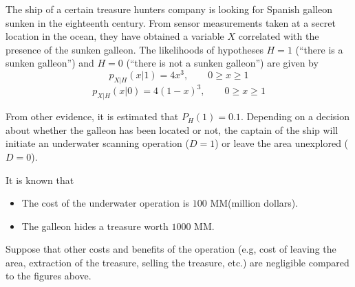 \begin{solution}
\end{solution}

\else
\question[25] %

The ship of a certain treasure hunters company is looking for Spanish galleon sunken in the eighteenth century. From sensor measurements taken at a secret location in the ocean, they have obtained a variable $X$ correlated with the presence of the sunken galleon. The likelihoods of hypotheses $H=1$ (``there is a sunken galleon'') and $H=0$ (``there is not a sunken galleon'') are given by
$$p_{X|H}(x|1) = 4 x^3,     \qquad 0 \ge x \ge 1$$
$$p_{X|H}(x|0) = 4 (1-x)^3, \qquad 0 \ge x \ge 1$$

From other evidence, it is estimated that $P_H(1) = 0.1$. Depending on a decision about whether the galleon has been located or not, the captain of the ship will initiate an underwater scanning operation ($D=1$) or leave the area unexplored ($D=0$).

It is known that
\begin{itemize}
\item The cost of the underwater operation is $100$ MM\textdollar (million dollars).
\item The galleon hides a treasure worth $1000$ MM\textdollar.
\end{itemize}

Suppose that other costs and benefits of the operation (e.g, cost of leaving the area, extraction of the treasure, selling the treasure, etc.) are negligible compared to the figures above.

